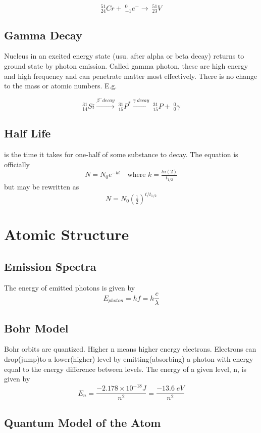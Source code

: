 \documentclass[../GChemReview.tex]{subfiles}
\begin{document}
  \[ ^{51}_{24}Cr + \; ^{0}_{-1}e^{-} \rightarrow \; ^{51}_{23}V\]

  \subsection{Gamma Decay}

  Nucleus in an excited energy state (usu. after alpha or beta decay) returns to
  ground state by photon emission. Called gamma photon, these are high energy
  and high frequency and can penetrate matter most effectively. There is no
  change to the mass or atomic numbers. E.g.

  $$ ^{31}_{14}Si \xrightarrow{\beta^{-} decay} \; ^{31}_{15}P^{*}
  \xrightarrow{\gamma \; decay} \; ^{31}_{15}P + \; ^{0}_{0}\gamma$$


  \subsection{Half Life}

   is the time it takes for one-half of some substance to
  decay. The equation is officially 
  \[ N = N_{0}e^{-kt} \quad \text{where } k = \tfrac{ln(2)}{t_{1/2}}\]
  but may be rewritten as
  \[ \boxed{N = N_{0}(\tfrac{1}{2})^{t/t_{1/2}}} \]

  \section{Atomic Structure}

  \subsection{Emission Spectra}

  The energy of emitted photons is given by
  \[ E_{photon} = hf = h\dfrac{c}{\lambda} \]

  \subsection{Bohr Model}

  Bohr orbits are quantized. Higher n means higher energy electrons. Electrons
  can drop(jump)to a lower(higher) level by emitting(absorbing) a photon with
  energy equal to the energy difference between levels. The energy of a given
  level, n, is given by 
  \[ E_{n} = \dfrac{-2.178 \times 10^{-18 }J}{n^{2}} = \dfrac{-13.6 \;
  eV}{n^{2}}\]

  \subsection{Quantum Model of the Atom}
\end{document}
